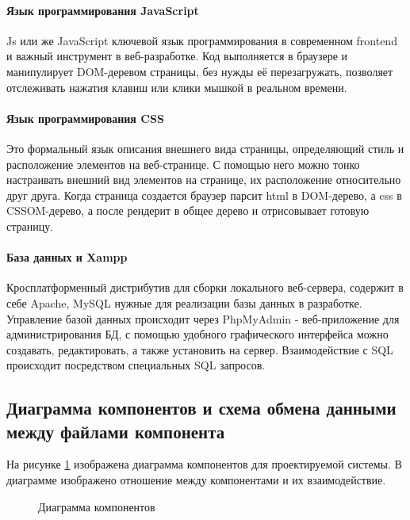 \paragraph{Язык программирования JavaScript}

Js или же JavaScript ключевой язык программирования в современном frontend и важный инструмент в веб-разработке. Код выполняется в браузере и манипулирует DOM-деревом страницы, без нужды её перезагружать, позволяет отслеживать нажатия клавиш или клики мышкой в реальном времени.

\paragraph{Язык программирования CSS}

Это формальный язык описания внешнего вида страницы, определяющий стиль и расположение элементов на веб-странице. С помощью него можно тонко настраивать внешний вид элементов на странице, их расположение относительно друг друга. Когда страница создается браузер парсит html в DOM-дерево, а css в CSSOM-дерево, а после рендерит в общее дерево и отрисовывает готовую страницу.

\paragraph{База данных и Xampp}

Кросплатформенный  дистрибутив для сборки локального веб-сервера, содержит в себе Apache, MySQL нужные для реализации базы данных в разработке. Управление базой данных происходит через PhpMyAdmin - веб-приложение для администрирования БД, с помощью удобного графического интерфейса можно создавать, редактировать, а также установить на сервер. Взаимодействие с SQL происходит посредством специальных SQL запросов.

\subsection{Диаграмма компонентов и схема обмена данными между файлами компонента}

На рисунке \ref{thatsmedio1:image} изображена диаграмма компонентов для проектируемой системы. В диаграмме изображено отношение между компонентами и их взаимодействие.

\begin{figure}[ht]
\caption{Диаграмма компонентов}
\label{thatsmedio1:image}
\end{figure}

